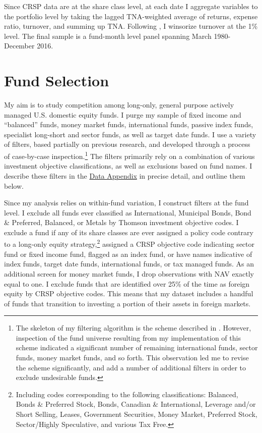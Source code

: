 \documentclass[openany]{book}
\let\rmarkdownfootnote\footnote%
\def\footnote{\protect\rmarkdownfootnote}
\theoremstyle{definition}
\theoremstyle{definition}
\theoremstyle{definition}
\theoremstyle{remark}
\begin{document}
Since CRSP data are at the share class level, at each date I aggregate
variables to the portfolio level by taking the lagged TNA-weighted
average of returns, expense ratio, turnover, and summing up TNA.
Following \citet{pst17}, I winsorize turnover at the 1\% level. The
final sample is a fund-month level panel spanning March 1980-December
2016.

\section{Fund Selection}\label{fund-selection}

My aim is to study competition among long-only, general purpose actively
managed U.S. domestic equity funds. I purge my sample of fixed income
and ``balanced'' funds, money market funds, international funds, passive
index funds, specialist long-short and sector funds, as well as target
date funds. I use a variety of filters, based partially on previous
research, and developed through a process of case-by-case
inspection.\footnote{The skeleton of my filtering algorithm is the
  scheme described in \citet{ksz08}. However, inspection of the fund
  universe resulting from my implementation of this scheme indicated a
  significant number of remaining international funds, sector funds,
  money market funds, and so forth. This observation led me to revise
  the scheme significantly, and add a number of additional filters in
  order to exclude undesirable funds.} The filters primarily rely on a
combination of various investment objective classifications, as well as
exclusions based on fund names. I describe these filters in the
\href{https://www.dropbox.com/s/qugvhb8b0wqp0cg/LJ_JMP_Data_Appendix.pdf?dl=0}{Data
Appendix} in precise detail, and outline them below.

Since my analysis relies on within-fund variation, I construct filters
at the fund level. I exclude all funds ever classified as International,
Municipal Bonds, Bond \& Preferred, Balanced, or Metals by Thomson
investment objective codes. I exclude a fund if any of its share classes
are ever assigned a policy code contrary to a long-only equity
strategy,\footnote{Including codes corresponding to the following
  classifications: Balanced, Bonds \& Preferred Stock, Bonds, Canadian
  \& International, Leverage and/or Short Selling, Leases, Government
  Securities, Money Market, Preferred Stock, Sector/Highly Speculative,
  and various Tax Free.} assigned a CRSP objective code indicating
sector fund or fixed income fund, flagged as an index fund, or have
names indicative of index funds, target date funds, international funds,
or tax managed funds. As an additional screen for money market funds, I
drop observations with NAV exactly equal to one. I exclude funds that
are identified over 25\% of the time as foreign equity by CRSP objective
codes. This means that my dataset includes a handful of funds that
transition to investing a portion of their assets in foreign markets.
\end{document}
